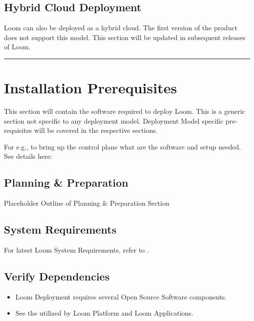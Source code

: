 \documentclass[letterpaper,10pt,english]{sphinxmanual}
\begin{document}
\section{Hybrid Cloud Deployment}
\label{\detokenize{loom_installation_guide:hybrid-cloud-deployment}}
Loom can also be deployed as a hybrid cloud. The first version of the product does not support this model.  This section will be updated in subsequent releases of Loom.


\bigskip\hrule\bigskip



\chapter{Installation Prerequisites}
\label{\detokenize{loom_installation_guide:installation-prerequisites}}
This section will contain the software required to deploy Loom. This is a generic section not specific to any deployment model. Deployment Model specific pre-requisites will be covered in the respective sections.

For e.g., to bring up the control plane what are the software and setup needed.
See details here: 


\section{Planning \& Preparation}
\label{\detokenize{loom_installation_guide:planning-preparation}}
Placeholder Outline of Planning \& Preparation Section


\section{System Requirements}
\label{\detokenize{loom_installation_guide:system-requirements}}
For latest Loom System Requirements, refer to .


\section{Verify Dependencies}
\label{\detokenize{loom_installation_guide:verify-dependencies}}\begin{itemize}
\item {} 
Loom Deployment requires several Open Source Software components.

\item {} 
See the  utilized by Loom Platform and Loom Applications.

\end{itemize}
\end{document}
